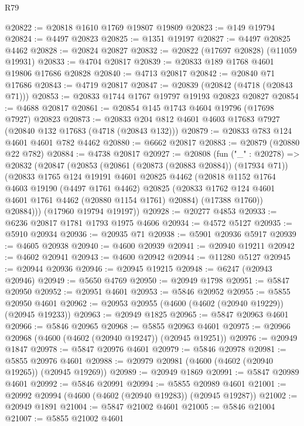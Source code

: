 \begin{lexlean}{R79}
\begin{coremodule}
@20822 := @20818 @1610 @1769 @19807 @19809
@20823 := @149 @19794
@20824 := @4497 @20823
@20825 := @1351 @19197
@20827 := @4497 @20825 @4462
@20828 := @20824 @20827
@20832 := @20822 (@17697 @20828) (@11059 @19931)
@20833 := @4704 @20817
@20839 := @20833 @189 @1768 @4601 @19806 @17686 @20828
@20840 := @4713 @20817
@20842 := @20840 @71 @17686
@20843 := @4719 @20817
@20847 := @20839 (@20842 (@4718 (@20843 @71)))
@20853 := @20833 @1744 @1767 @19797 @19193 @20823 @20827
@20854 := @4688 @20817
@20861 := @20854 @145 @1743 @4604 @19796 (@17698 @7927) @20823
@20873 := @20833 @204 @812 @4601 @4603 @17683 @7927 (@20840 @132 @17683 (@4718 (@20843 @132)))
@20879 := @20833 @783 @124 @4601 @4601 @782 @4462
@20880 := @6662 @20817
@20883 := @20879 (@20880 @22 @782)
@20884 := @4738 @20817
@20927 := @20808
    (fun ("_" : @20278) =>
    @20832
      (@20847
        (@20853
          (@20861 (@20873 (@20883 @20884)) (@17934 @71))
          (@20833
            @1765
            @124
            @19191
            @4601
            @20825
            @4462
            (@20818
              @1152
              @1764
              @4603
              @19190
              (@4497 @1761 @4462)
              @20825
              (@20833 @1762 @124 @4601 @4601 @1761 @4462 (@20880 @1154 @1761) @20884)
              (@17388 @1760))
            @20884)))
      (@17960 @19794 @19197))
@20928 := @20277 @4853
@20933 := @6236 @20817 @1781 @1793 @1975 @4606
@20934 := @4572 @5127
@20935 := @5910 @20934
@20936 := @20935 @71
@20938 := @5901 @20936 @5917
@20939 := @4605 @20938
@20940 := @4600 @20939
@20941 := @20940 @19211
@20942 := @4602 @20941
@20943 := @4600 @20942
@20944 := @11280 @5127
@20945 := @20944 @20936
@20946 := @20945 @19215
@20948 := @6247 (@20943 @20946)
@20949 := @5650 @4769
@20950 := @20949 @1798
@20951 := @5847 @20950
@20952 := @20951 @4601
@20953 := @5846 @20952
@20955 := @5855 @20950 @4601
@20962 := @20953 @20955 (@4600 (@4602 (@20940 @19229)) (@20945 @19233))
@20963 := @20949 @1825
@20965 := @5847 @20963 @4601
@20966 := @5846 @20965
@20968 := @5855 @20963 @4601
@20975 := @20966 @20968 (@4600 (@4602 (@20940 @19247)) (@20945 @19251))
@20976 := @20949 @1847
@20978 := @5847 @20976 @4601
@20979 := @5846 @20978
@20981 := @5855 @20976 @4601
@20988 := @20979 @20981 (@4600 (@4602 (@20940 @19265)) (@20945 @19269))
@20989 := @20949 @1869
@20991 := @5847 @20989 @4601
@20992 := @5846 @20991
@20994 := @5855 @20989 @4601
@21001 := @20992 @20994 (@4600 (@4602 (@20940 @19283)) (@20945 @19287))
@21002 := @20949 @1891
@21004 := @5847 @21002 @4601
@21005 := @5846 @21004
@21007 := @5855 @21002 @4601

\end{coremodule}
\end{lexlean}
